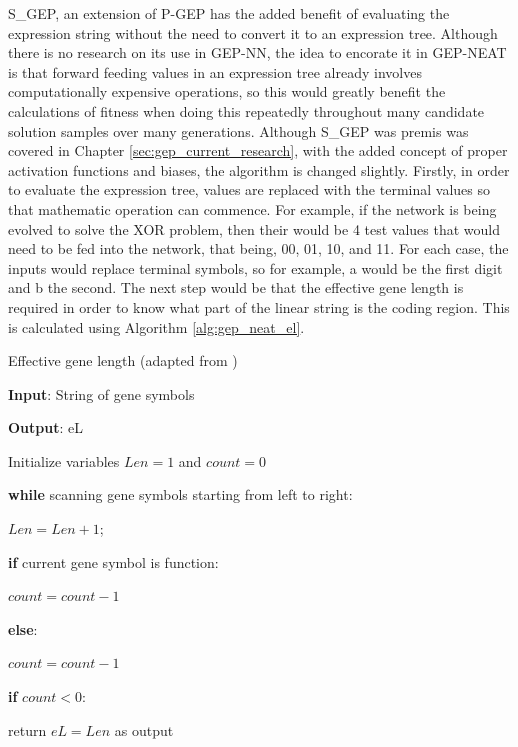 \noindent S\_GEP, an extension of P-GEP has the added benefit of evaluating the expression string without the need to convert it to an expression tree. Although there is no research on its use in GEP-NN, the idea to encorate it in GEP-NEAT is that forward feeding values in an expression tree already involves computationally expensive operations, so this would greatly benefit the calculations of fitness when doing this repeatedly throughout many candidate solution samples over many generations. Although S\_GEP was premis was covered in Chapter \ref{sec:gep_current_research}, with the added concept of proper activation functions and biases, the algorithm is changed slightly. Firstly, in order to evaluate the expression tree, values are replaced with the terminal values so that mathematic operation can commence. For example, if the network is being evolved to solve the XOR problem, then their would be 4 test values that would need to be fed into the network, that being, 00, 01, 10, and 11. For each case, the inputs would replace terminal symbols, so for example, a would be the first digit and b the second. The next step would be that the effective gene length is required in order to know what part of the linear string is the coding region. This is calculated using Algorithm \ref{alg:gep_neat_el}.

\begin{algorithm}
	\caption{Effective gene length (adapted from \cite{peng2014improved})}\label{alg:gep_neat_el}
	\begin{algorithmic}[1]
	\item \textbf{Input}: String of gene symbols
	\item \textbf{Output}: eL
	\item Initialize variables $Len=1$ and $count=0$
	\item \textbf{while} scanning gene symbols starting from left to right:
	\item \quad $Len = Len + 1$;
	\item \quad \textbf{if} current gene symbol is function:
	\item \quad \quad $count = count - 1$
	\item \quad \textbf{else}:
	\item \quad \quad $count = count - 1$
	\item \quad \textbf{if} $count < 0$:
	\item \quad \quad return $eL=Len$ as output
\end{algorithmic}
\end{algorithm}

